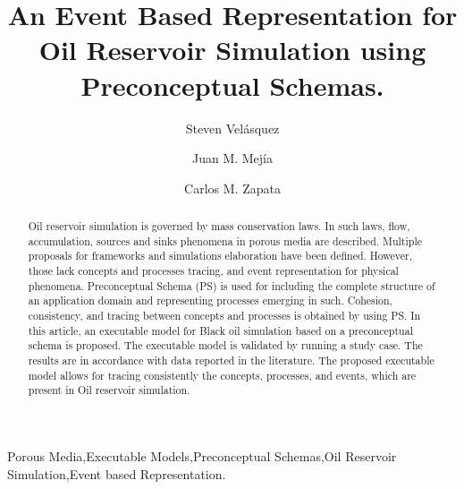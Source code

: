 \documentclass[review]{elsarticle}
\begin{document}
\begin{frontmatter}

\title{An Event Based Representation for Oil Reservoir Simulation using Preconceptual Schemas.}


\author[mymainaddress]{Steven Vel\'asquez}

\author[mysecondaryaddress1]{Juan M. Mej\'ia}
\author[mysecondaryaddress2]{Carlos M. Zapata}


\address[mymainaddress]{National University of Colombia, Medellin. Department of Computer and Decision Science.}
\address{
	}
\address[mysecondaryaddress1]{National University of Colombia, Medellin. Department of Processes and Energy.}
\address[mysecondaryaddress2]{National University of Colombia, Medellin. Department of Computer and Decision Science.}


\begin{abstract}
	Oil reservoir simulation is governed by mass conservation laws. In such laws, flow, accumulation, sources and sinks phenomena in porous media are described. Multiple proposals for frameworks and simulations elaboration have been defined. However, those lack concepts and processes tracing, and event representation for physical phenomena. Preconceptual Schema (PS) is used for including the complete structure of an application domain and representing processes emerging in such. Cohesion, consistency, and tracing between concepts and processes is obtained by using PS. In this article, an executable model for Black oil simulation based on a preconceptual schema is proposed. The executable model is validated by running a study case. The results are in accordance with data reported in the literature. The proposed executable model allows for tracing consistently the concepts, processes, and events, which are present in Oil reservoir simulation. 
\end{abstract}

\begin{keyword}
	Porous Media\sep Executable Models\sep Preconceptual Schemas\sep Oil Reservoir Simulation\sep Event based Representation.
\end{keyword}

\end{frontmatter}
\end{document}
